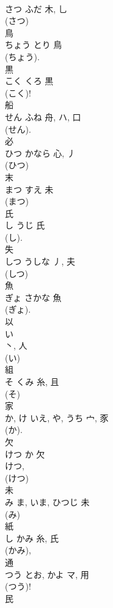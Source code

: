 \documentclass[8pt]{extreport}
\begin{document}
\begin{CJK}{UTF8}{min}
\\	さつ	ふだ	木, 乚	
\\	(さつ) 
\\	鳥	
\\	ちょう	とり	鳥	
\\	(ちょう).	
\\	黒	
\\	こく	くろ	黒	
\\	(こく)! 
\\	船	
\\	せん	ふね	舟, ハ, 口	
\\	(せん). 
\\	必	
\\	ひつ	かなら	心, 丿	
\\	(ひつ) 
\\	末	
\\	まつ	すえ	未	
\\	(まつ) 
\\	氏	
\\	し	うじ	氏	
\\	(し). 
\\	失	
\\	しつ	うしな	丿, 夫	
\\	(しつ) 
\\	魚	
\\	ぎょ	さかな	魚	
\\	(ぎょ). 
\\	以	
\\	い	
\\	丶, 人	
\\	(い) 
\\	組	
\\	そ	くみ	糸, 且	
\\	(そ) 
\\	家	
\\	か, け	いえ, や, うち	宀, 豕	
\\	(か). 
\\	欠	
\\	けつ	か	欠	
\\	けつ, 
\\	(けつ) 
\\	未	
\\	み	ま, いま, ひつじ	未	
\\	(み) 
\\	紙	
\\	し	かみ	糸, 氏	
\\	(かみ), 
\\	通	
\\	つう	とお, かよ	マ, 用		
\\	(つう)!
\\	民	

\end{CJK}
\end{document}
